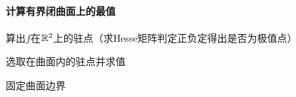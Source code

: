 \paragraph{计算有界闭曲面上的最值}
\begin{compactenum}[(1)]
	\item 算出$f$在$\mathbb R^2$上的驻点（求Hesse矩阵判定正负定得出是否为极值点）
	\item 选取在曲面内的驻点并求值
	\item 固定曲面边界
\end{compactenum}
\newpage
